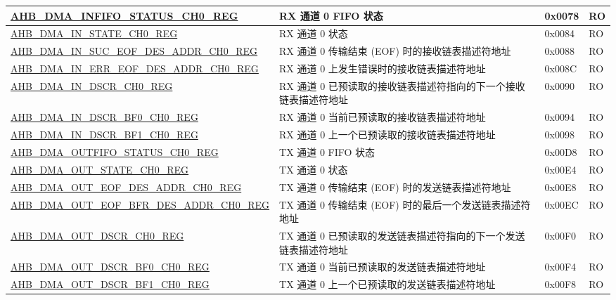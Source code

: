 \begin{longtable}{ | p{8cm} | p{8cm} | p{1.3cm} | p{1.5cm} | }
\hyperref[regdesc:AHBDMAINFIFOSTATUSCHNREG]{AHB\_DMA\_INFIFO\_STATUS\_CH0\_REG} & RX 通道 0 FIFO 状态 & 0x0078 & RO \\ \hline
\hyperref[regdesc:AHBDMAINSTATECHNREG]{AHB\_DMA\_IN\_STATE\_CH0\_REG} & RX 通道 0 状态 & 0x0084 & RO \\ \hline
\hyperref[regdesc:AHBDMAINSUCEOFDESADDRCHNREG]{AHB\_DMA\_IN\_SUC\_EOF\_DES\_ADDR\_CH0\_REG} & RX 通道 0 传输结束 (EOF) 时的接收链表描述符地址 & 0x0088 & RO \\ \hline
\hyperref[regdesc:AHBDMAINERREOFDESADDRCHNREG]{AHB\_DMA\_IN\_ERR\_EOF\_DES\_ADDR\_CH0\_REG} & RX 通道 0 上发生错误时的接收链表描述符地址 & 0x008C & RO \\ \hline
\hyperref[regdesc:AHBDMAINDSCRCHNREG]{AHB\_DMA\_IN\_DSCR\_CH0\_REG} & RX 通道 0 已预读取的接收链表描述符指向的下一个接收链表描述符地址 & 0x0090 & RO \\ \hline
\hyperref[regdesc:AHBDMAINDSCRBF0CHNREG]{AHB\_DMA\_IN\_DSCR\_BF0\_CH0\_REG} & RX 通道 0 当前已预读取的接收链表描述符地址 & 0x0094 & RO \\ \hline
\hyperref[regdesc:AHBDMAINDSCRBF1CHNREG]{AHB\_DMA\_IN\_DSCR\_BF1\_CH0\_REG} & RX 通道 0 上一个已预读取的接收链表描述符地址 & 0x0098 & RO \\ \hline
\hyperref[regdesc:AHBDMAOUTFIFOSTATUSCHNREG]{AHB\_DMA\_OUTFIFO\_STATUS\_CH0\_REG} & TX 通道 0 FIFO 状态 & 0x00D8 & RO \\ \hline
\hyperref[regdesc:AHBDMAOUTSTATECHNREG]{AHB\_DMA\_OUT\_STATE\_CH0\_REG} & TX 通道 0 状态 & 0x00E4 & RO \\ \hline
\hyperref[regdesc:AHBDMAOUTEOFDESADDRCHNREG]{AHB\_DMA\_OUT\_EOF\_DES\_ADDR\_CH0\_REG} & TX 通道 0 传输结束 (EOF) 时的发送链表描述符地址 & 0x00E8 & RO \\ \hline
\hyperref[regdesc:AHBDMAOUTEOFBFRDESADDRCHNREG]{AHB\_DMA\_OUT\_EOF\_BFR\_DES\_ADDR\_CH0\_REG} & TX 通道 0 传输结束 (EOF) 时的最后一个发送链表描述符地址 & 0x00EC & RO \\ \hline
\hyperref[regdesc:AHBDMAOUTDSCRCHNREG]{AHB\_DMA\_OUT\_DSCR\_CH0\_REG} & TX 通道 0 已预读取的发送链表描述符指向的下一个发送链表描述符地址 & 0x00F0 & RO \\ \hline
\hyperref[regdesc:AHBDMAOUTDSCRBF0CHNREG]{AHB\_DMA\_OUT\_DSCR\_BF0\_CH0\_REG} & TX 通道 0 当前已预读取的发送链表描述符地址 & 0x00F4 & RO \\ \hline
\hyperref[regdesc:AHBDMAOUTDSCRBF1CHNREG]{AHB\_DMA\_OUT\_DSCR\_BF1\_CH0\_REG} & TX 通道 0 上一个已预读取的发送链表描述符地址 & 0x00F8 & RO \\ \hline

\end{longtable}
